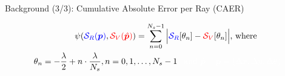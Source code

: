 \begin{frame}[noframenumbering]{Background (3/3): Cumulative Absolute Error per Ray (CAER)}

  \begin{overlayarea}{\textwidth}{\textheight}

    \begin{align}
      \psi(\textcolor{blue}{\mathcal{S}_R(\bm{p})}, \textcolor{red}{\mathcal{S}_V(\hat{\bm{p}})}) &= \sum\limits_{n=0}^{N_s-1}\Big|\textcolor{blue}{\mathcal{S}_R}[\theta_n] - \textcolor{red}{\mathcal{S}_V}[\theta_n] \Big| \text{, where} \nonumber \\
      \theta_n = -\dfrac{\lambda}{2} + n \cdot \dfrac{\lambda}{N_s}, n = 0,1,&\dots,N_s-1\textcolor{white}{, \text{ and } \hat{\bm{p}}-\bm{p} = (\Delta x, \Delta y, \Delta \theta )}\nonumber
    \end{align}

  \end{overlayarea}

\end{frame}
